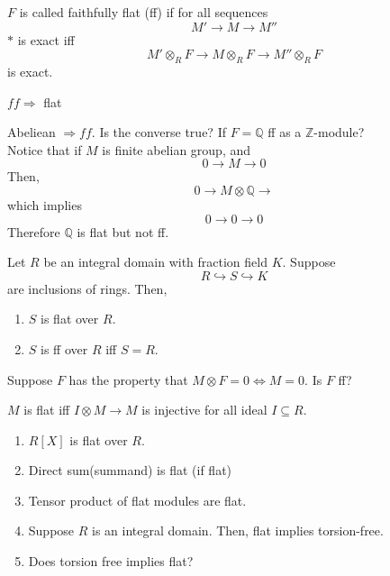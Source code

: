 \documentclass[oneside, 12pt]{scrbook}
\newcommand{\QQ}{\mathbb Q}
\newcommand{\ZZ}{\mathbb Z}
\theoremstyle{theorem}
\begin{document}
\begin{definition}
$F$ is called faithfully flat (ff) if for all sequences 
\begin{equation}[*]
M' \longrightarrow M \longrightarrow M''
\end{equation}
$*$ is exact iff 
\begin{equation}[**]
M' \otimes_{R} F \longrightarrow M \otimes_{R} F \longrightarrow M'' \otimes_{R} F 
\end{equation}
is exact.
\end{definition}

\begin{remark}
$ff \Rightarrow $ flat
\end{remark}

\begin{example}
Abeliean $\Rightarrow ff$. Is the converse true? If $F= \QQ $ ff as a $\ZZ$-module?\\

Notice that if $M$ is finite abelian group, and $$0 \rightarrow M \rightarrow 0$$ Then, $$0 \rightarrow M \otimes \QQ \rightarrow$$ which implies $$0 \rightarrow 0 \rightarrow 0$$ Therefore $\QQ$ is flat but not ff.
\end{example}

\begin{theorem}
Let $R$ be an integral domain with fraction field $K$. Suppose $$R \hookrightarrow S \hookrightarrow K$$ are inclusions of rings. Then, 
\begin{enumerate}
\item $S$ is flat over $R$.
\item $S$ is ff over $R$ iff $S=R$.
\end{enumerate}
\end{theorem}

\begin{exercise}
Suppose $F$ has the property that $M \otimes F = 0 \Leftrightarrow M=0$. Is $F$ ff?
\end{exercise}

\begin{theorem}
$M$ is flat iff $I \otimes M \rightarrow M$ is injective for all ideal $I \subseteq R$.
\end{theorem}

\begin{exercise}
\begin{enumerate}
\item $R[X]$ is flat over $R$.
\item Direct sum(summand) is flat (if flat)
\item Tensor product of flat modules are flat.
\item Suppose $R$ is an integral domain. Then, flat implies torsion-free.
\item Does torsion free implies flat? 
\end{enumerate}
\end{exercise}
\end{document}
